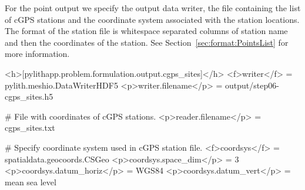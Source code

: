 For the point output we specify the output data writer, the file
containing the list of cGPS stations and the coordinate system
associated with the station locations. The format of the station file
is whitespace separated columns of station name and then the
coordinates of the station. See Section~\vref{sec:format:PointsList}
for more information.
\begin{cfg}
<h>[pylithapp.problem.formulation.output.cgps_sites]</h>
<f>writer</f> = pylith.meshio.DataWriterHDF5
<p>writer.filename</p> = output/step06-cgps_sites.h5

# File with coordinates of cGPS stations.
<p>reader.filename</p> = cgps_sites.txt

# Specify coordinate system used in cGPS station file.
<f>coordsys</f> = spatialdata.geocoords.CSGeo
<p>coordsys.space_dim</p> = 3
<p>coordsys.datum_horiz</p> = WGS84
<p>coordsys.datum_vert</p> = mean sea level
\end{cfg}

